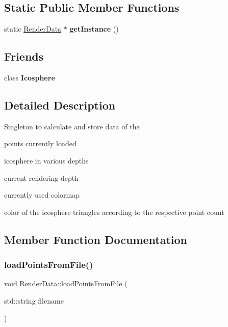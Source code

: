 \subsection*{Static Public Member Functions}
\begin{DoxyCompactItemize}
\item 
\mbox{\label{class_render_data_a1fffc72f3dd17ab052d4fb2f025ef5a0}} 
static \hyperlink{class_render_data}{Render\+Data} $\ast$ {\bfseries get\+Instance} ()
\end{DoxyCompactItemize}
\subsection*{Friends}
\begin{DoxyCompactItemize}
\item 
\mbox{\label{class_render_data_aae9e6e2f2e7f9a8cde35b65facc0750b}} 
class {\bfseries Icosphere}
\end{DoxyCompactItemize}


\subsection{Detailed Description}
Singleton to calculate and store data of the
\begin{DoxyItemize}
\item points currently loaded
\item icosphere in various depths
\item current rendering depth
\item currently used colormap
\item color of the icosphere triangles according to the respective point count 
\end{DoxyItemize}

\subsection{Member Function Documentation}
\mbox{\label{class_render_data_ac161f29f7d6ae6fd3912e8af7bdccdfd}} 
\subsubsection{\texorpdfstring{load\+Points\+From\+File()}{loadPointsFromFile()}}
{\footnotesize\ttfamily void Render\+Data\+::load\+Points\+From\+File (\begin{DoxyParamCaption}\item[{std\+::string}]{filename }\end{DoxyParamCaption})}

